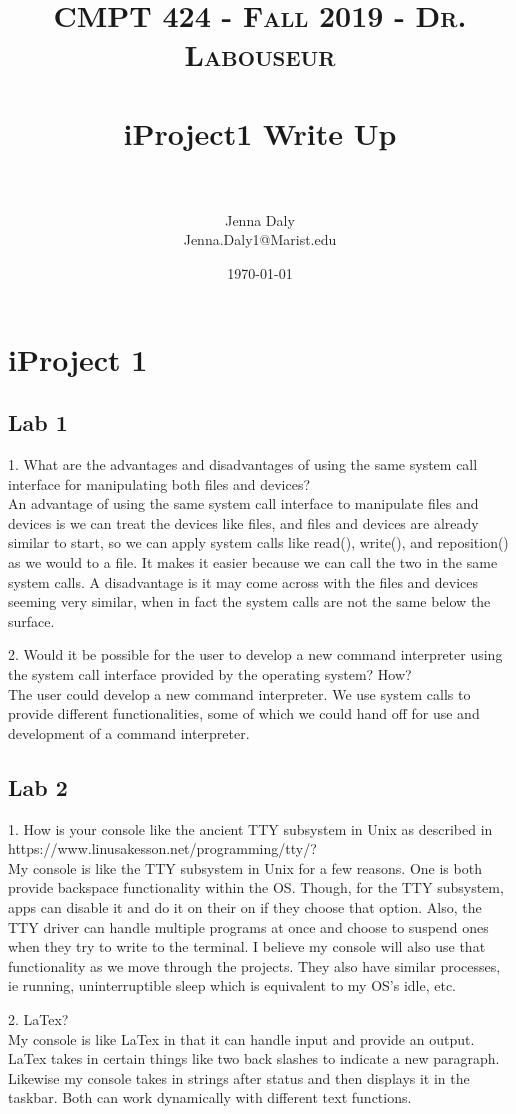 \documentclass[letterpaper, 10pt,DIV=13]{scrartcl}
\title{	
   \normalfont \normalsize 
   \textsc{CMPT 424 - Fall 2019 - Dr. Labouseur} \\[10pt] %
   \horrule{0.5pt} \\[0.25cm] 	%
   \huge iProject1 Write Up  \\     	    %
   \horrule{0.5pt} \\[0.25cm] 	%
}
\author{Jenna Daly \\ \normalsize Jenna.Daly1@Marist.edu}
\date{\normalsize\today} 	%
\numberwithin{equation}{section} %
\numberwithin{figure}{section} %
\numberwithin{table}{section} %
\begin{document}
\maketitle %

\section{iProject 1}

\subsection{Lab 1}
1. What are the advantages and disadvantages of using the same system call interface for manipulating both files and devices?
\\An advantage of using the same system call interface to manipulate files and devices is we can treat the devices like files, and files and devices are already similar to start, so we can apply system calls like read(), write(), and reposition() as we would to a file. It makes it easier because we can call the two in the same system calls. A disadvantage is it may come across with the files and devices seeming very similar, when in fact the system calls are not the same below the surface.

2. Would it be possible for the user to develop a new command interpreter using the system call interface provided by the operating system? How?	
\\The user could develop a new command interpreter. We use system calls to provide different functionalities, some of which we could hand off for use and development of a command interpreter.

\subsection{Lab 2}
1. How is your console like the ancient TTY subsystem in Unix as described in https://www.linusakesson.net/programming/tty/?
\\My console is like the TTY subsystem in Unix for a few reasons. One is both provide backspace functionality within the OS. Though, for the TTY subsystem, apps can disable it and do it on their on if they choose that option. Also, the TTY driver can handle multiple programs at once and choose to suspend ones when they try to write to the terminal. I believe my console will also use that functionality as we move through the projects. They also have similar processes, ie running, uninterruptible sleep which is equivalent to my OS's idle, etc.

2. LaTex?
\\My console is like LaTex in that it can handle input and provide an output. LaTex takes in certain things like two back slashes to indicate a new paragraph. Likewise my console takes in strings after status and then displays it in the taskbar. Both can work dynamically with different text functions.
\end{document}
